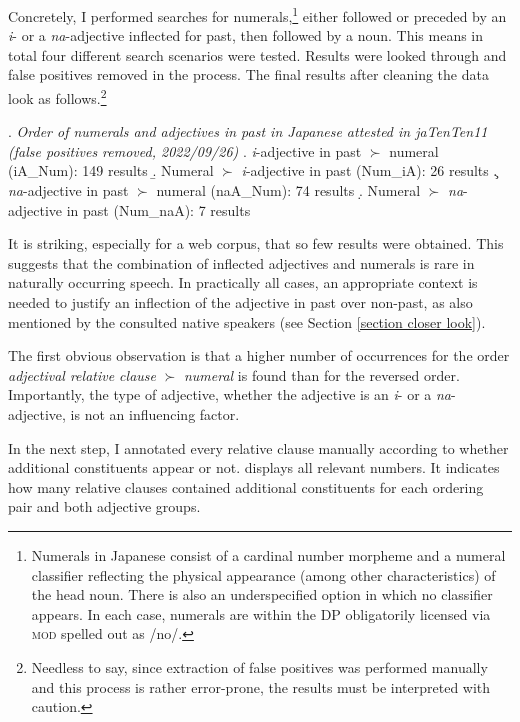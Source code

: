 Concretely, I performed searches for numerals,\footnote{Numerals in Japanese consist of a cardinal number morpheme and a numeral classifier reflecting the physical appearance (among other characteristics) of the head noun. There is also an underspecified option in which no classifier appears. In each case, numerals are within the DP obligatorily licensed via \textsc{mod} spelled out as /no/.} either followed or preceded by an \textit{i}- or a \textit{na}-adjective inflected for past, then followed by a noun. This means in total four different search scenarios were tested. Results were looked through and false positives removed in the process. The final results after cleaning the data look as follows.\footnote{Needless to say, since extraction of false positives was performed manually and this process is rather error-prone, the results must be interpreted with caution.} 

\ex. \emph{Order of numerals and adjectives in past in Japanese attested in jaTenTen11 (false positives removed, 2022/09/26)}
\a. \textit{i}-adjective in past $\succ$ numeral (iA\_Num): 149 results
\b. Numeral $\succ$ \textit{i}-adjective in past (Num\_iA): 26 results
\c. \textit{na}-adjective in past $\succ$ numeral (naA\_Num): 74 results
\d. Numeral $\succ$ \textit{na}-adjective in past (Num\_naA): 7 results

It is striking, especially for a web corpus, that so few results were obtained. This suggests that the combination of inflected adjectives and numerals is rare in naturally occurring speech. In practically all cases, an appropriate context is needed to justify an inflection of the adjective in past over non-past, as also mentioned by the consulted native speakers (see Section \ref{section closer look}).

The first obvious observation is that a higher number of occurrences for the order \textit{adjectival relative clause} $\succ$ \textit{numeral} is found than for the reversed order. Importantly, the type of adjective, whether the adjective is an \textit{i}- or a \textit{na}-adjective, is not an influencing factor.

In the next step, I annotated every relative clause manually according to whether additional constituents appear or not.  displays all relevant numbers. It indicates how many relative clauses contained additional constituents for each ordering pair and both adjective groups.

